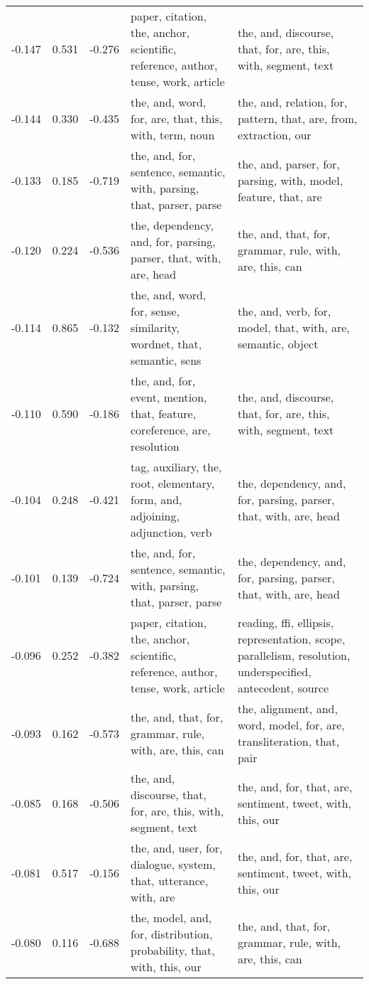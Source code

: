 \begin{tabular}{cccp{5cm}p{5cm}}
-0.147 & 0.531 & -0.276 & paper, citation, the, anchor, scientific, reference, author, tense, work, article & the, and, discourse, that, for, are, this, with, segment, text \\
-0.144 & 0.330 & -0.435 & the, and, word, for, are, that, this, with, term, noun & the, and, relation, for, pattern, that, are, from, extraction, our \\
-0.133 & 0.185 & -0.719 & the, and, for, sentence, semantic, with, parsing, that, parser, parse & the, and, parser, for, parsing, with, model, feature, that, are \\
-0.120 & 0.224 & -0.536 & the, dependency, and, for, parsing, parser, that, with, are, head & the, and, that, for, grammar, rule, with, are, this, can \\
-0.114 & 0.865 & -0.132 & the, and, word, for, sense, similarity, wordnet, that, semantic, sens & the, and, verb, for, model, that, with, are, semantic, object \\
-0.110 & 0.590 & -0.186 & the, and, for, event, mention, that, feature, coreference, are, resolution & the, and, discourse, that, for, are, this, with, segment, text \\
-0.104 & 0.248 & -0.421 & tag, auxiliary, the, root, elementary, form, and, adjoining, adjunction, verb & the, dependency, and, for, parsing, parser, that, with, are, head \\
-0.101 & 0.139 & -0.724 & the, and, for, sentence, semantic, with, parsing, that, parser, parse & the, dependency, and, for, parsing, parser, that, with, are, head \\
-0.096 & 0.252 & -0.382 & paper, citation, the, anchor, scientific, reference, author, tense, work, article & reading, ffi, ellipsis, representation, scope, parallelism, resolution, underspecified, antecedent, source \\
-0.093 & 0.162 & -0.573 & the, and, that, for, grammar, rule, with, are, this, can & the, alignment, and, word, model, for, are, transliteration, that, pair \\
-0.085 & 0.168 & -0.506 & the, and, discourse, that, for, are, this, with, segment, text & the, and, for, that, are, sentiment, tweet, with, this, our \\
-0.081 & 0.517 & -0.156 & the, and, user, for, dialogue, system, that, utterance, with, are & the, and, for, that, are, sentiment, tweet, with, this, our \\
-0.080 & 0.116 & -0.688 & the, model, and, for, distribution, probability, that, with, this, our & the, and, that, for, grammar, rule, with, are, this, can \\

\end{tabular}
